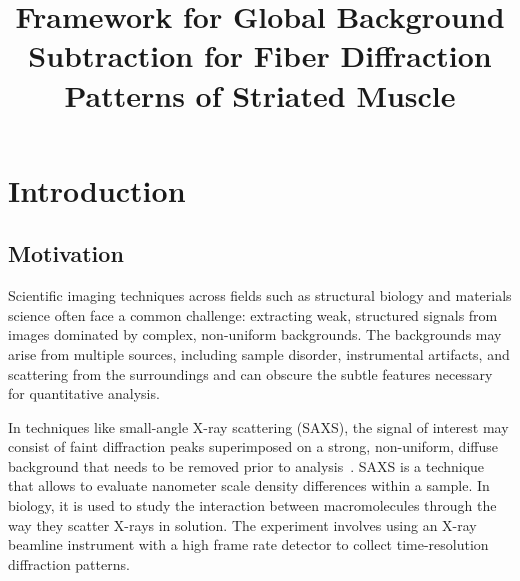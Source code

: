 \documentclass[iucr,review]{iucrjournals}
\title{Framework for Global Background Subtraction for Fiber Diffraction
Patterns of Striated Muscle}
\begin{document}
\maketitle

\begin{synopsis}
\end{synopsis}

\begin{abstract}
\end{abstract}


\section{Introduction}
\subsection{Motivation}

Scientific imaging techniques across fields such as structural biology and materials science often face a common challenge:
extracting weak, structured signals from images dominated by complex, non-uniform backgrounds.
The backgrounds may arise from multiple sources, including sample disorder, instrumental artifacts, and scattering from
the surroundings and can obscure the subtle features necessary for quantitative analysis.

In techniques like small-angle X-ray scattering (SAXS), the signal of interest may consist of faint diffraction peaks
superimposed on a strong, non-uniform, diffuse background that needs to be removed prior to analysis~\cite{ResearchPlanMusico}.
SAXS is a technique that allows to evaluate nanometer scale density differences within a sample. 
In biology, it is used to study the interaction between macromolecules through the way they scatter X-rays in solution. 
The experiment involves using an X-ray beamline instrument with a high frame rate detector to collect time-resolution diffraction patterns.
\end{document}
